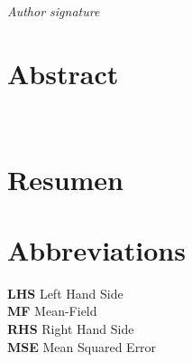 \documentclass[openany]{article}
\begin{document}
    \lipsum[1]
    
    \mbox{}\par 
    \vspace{0.5cm}
    
    \begin{flushright}
        \textit{Author signature}
    \end{flushright}


\clearpage\thispagestyle{empty}\null\newpage %

\newpage
\thispagestyle{plain}

\section*{Abstract}

    \lipsum[1]\\
    
    \vspace{2cm}
    
\section*{Resumen}

    \lipsum[1]
    
%

\clearpage\thispagestyle{empty}\null\newpage %

\newpage
\thispagestyle{plain}

\section*{Abbreviations}

\textbf{LHS} Left Hand Side \\

\textbf{MF} Mean-Field \\

\textbf{RHS} Right Hand Side \\

\textbf{MSE} Mean Squared Error

\clearpage\thispagestyle{empty}\null\newpage %

\newpage
\thispagestyle{plain}
{
\hypersetup{hidelinks}
\tableofcontents
}


\thispagestyle{empty}

\clearpage\thispagestyle{empty}\null\newpage %


\newpage


\newpage


\newpage


\newpage


\newpage


\newpage


\newpage


\newpage


\newpage

\end{document}
